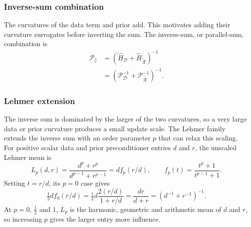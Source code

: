 \subsubsection{Inverse-sum combination}

The curvatures of the data term and prior add. This motivates adding their curvature surrogates before inverting the sum. The inverse-sum, or parallel-sum, combination \cite{ehrhardtFastPETReconstruction2025a} is
\begin{equation}
    \begin{aligned}
        \mathcal{P}_{\parallel}
        &=
        \left(\widehat H_{\mathcal D}+\widehat H_{\widetilde{\mathcal R}}\right)^{-1}
        \\
        &=
        \left(\mathcal{P}_{\mathcal D}^{-1}+\mathcal{P}_{\widetilde{\mathcal R}}^{-1}\right)^{-1}.
    \end{aligned}
    \label{eq:parallel_sum_combination}
\end{equation}

\subsubsection{Lehmer extension}
\label{subsec:optimisation_lehmer}

The inverse sum is dominated by the larger of the two curvatures, so a very large data or prior curvature produces a small update scale. The Lehmer family extends the inverse sum with an order parameter $p$ that can relax this scaling. For positive scalar data and prior preconditioner entries $d$ and $r$, the unscaled Lehmer mean is
\[
    L_p(d,r)
    =\frac{d^p+r^p}{d^{p-1}+r^{p-1}}
    =d f_p(r/d),
    \qquad
    f_p(t)=\frac{t^p+1}{t^{p-1}+1}.
\]
Setting $t=r/d$, its $p=0$ case gives
\[
    \tfrac12 d f_0(r/d)
    =
    \tfrac12 d\frac{2(r/d)}{1+r/d}
    =
    \frac{dr}{d+r}
    =
    (d^{-1}+r^{-1})^{-1}.
\]
At $p=0$, $\tfrac12$ and $1$, $L_p$ is the harmonic, geometric and arithmetic mean of $d$ and $r$, so increasing $p$ gives the larger entry more influence.

